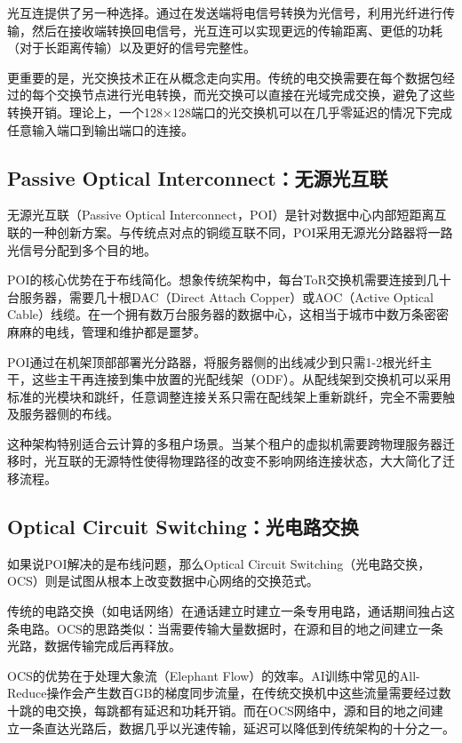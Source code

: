 光互连提供了另一种选择。通过在发送端将电信号转换为光信号，利用光纤进行传输，然后在接收端转换回电信号，光互连可以实现更远的传输距离、更低的功耗（对于长距离传输）以及更好的信号完整性。

更重要的是，光交换技术正在从概念走向实用。传统的电交换需要在每个数据包经过的每个交换节点进行光电转换，而光交换可以直接在光域完成交换，避免了这些转换开销。理论上，一个128×128端口的光交换机可以在几乎零延迟的情况下完成任意输入端口到输出端口的连接。

\subsection{Passive Optical Interconnect：无源光互联}

无源光互联（Passive Optical Interconnect，POI）是针对数据中心内部短距离互联的一种创新方案。与传统点对点的铜缆互联不同，POI采用无源光分路器将一路光信号分配到多个目的地。

POI的核心优势在于布线简化。想象传统架构中，每台ToR交换机需要连接到几十台服务器，需要几十根DAC（Direct Attach Copper）或AOC（Active Optical Cable）线缆。在一个拥有数万台服务器的数据中心，这相当于城市中数万条密密麻麻的电线，管理和维护都是噩梦。

POI通过在机架顶部部署光分路器，将服务器侧的出线减少到只需1-2根光纤主干，这些主干再连接到集中放置的光配线架（ODF）。从配线架到交换机可以采用标准的光模块和跳纤，任意调整连接关系只需在配线架上重新跳纤，完全不需要触及服务器侧的布线。

这种架构特别适合云计算的多租户场景。当某个租户的虚拟机需要跨物理服务器迁移时，光互联的无源特性使得物理路径的改变不影响网络连接状态，大大简化了迁移流程。

\subsection{Optical Circuit Switching：光电路交换}

如果说POI解决的是布线问题，那么Optical Circuit Switching（光电路交换，OCS）则是试图从根本上改变数据中心网络的交换范式。

传统的电路交换（如电话网络）在通话建立时建立一条专用电路，通话期间独占这条电路。OCS的思路类似：当需要传输大量数据时，在源和目的地之间建立一条光路，数据传输完成后再释放。

OCS的优势在于处理大象流（Elephant Flow）的效率。AI训练中常见的All-Reduce操作会产生数百GB的梯度同步流量，在传统交换机中这些流量需要经过数十跳的电交换，每跳都有延迟和功耗开销。而在OCS网络中，源和目的地之间建立一条直达光路后，数据几乎以光速传输，延迟可以降低到传统架构的十分之一。


